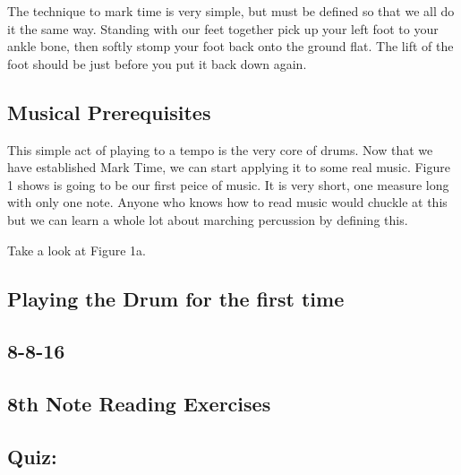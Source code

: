 \documentclass[12pt,letterpaper]{book}
\begin{document}

The technique to mark time is very simple, but must be defined so that we all do it the same way.  Standing with our feet together pick up your left foot to your ankle bone, then softly stomp your foot back onto the ground flat.  The lift of the foot should be just before you put it back down again.

\subsection{Musical Prerequisites}


This simple act of playing to a tempo is the very core of drums. Now that we have established Mark Time, we can start applying it to some real music.  Figure 1 shows is going to be our first peice of music.  It is very short, one measure long with only one note.  Anyone who knows how to read music would chuckle at this but we can learn a whole lot about marching percussion by defining this.

Take a look at Figure 1a. 

\subsection{Playing the Drum for the first time}


\subsection{8-8-16}


\subsection{8th Note Reading Exercises}


\subsection{Quiz:}

\end{document}
